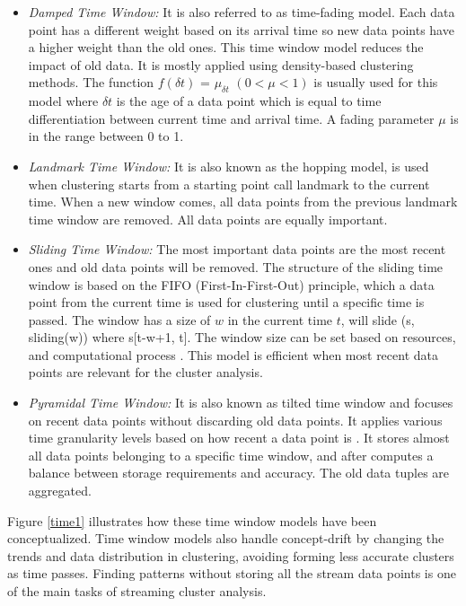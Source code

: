 \begin{itemize}

    \item\textit{Damped Time Window:} It is also referred to as time-fading model. Each data point has a different weight based on its arrival time so new data points have a higher weight than the old ones. This time window model reduces the impact of old data. It is mostly applied using density-based clustering methods. The function $f(\delta t)$ = $\mu_{\delta t}$ $(0 < \mu < 1)$ is usually used for this model where $\delta t$ is the age of a data point which is equal to time differentiation between current time and arrival time. A fading parameter $\mu$ is in the range between 0 to 1. 
    
    
    \item\textit{Landmark Time Window:} It is also known as the hopping model, is used when clustering starts from a starting point call landmark to the current time. When a new window comes, all data points from the previous landmark time window are removed. All data points are equally important.

    \item\textit{Sliding Time Window: } The most important data points are the most recent ones and old data points will be removed. The structure of the sliding time window is based on the FIFO (First-In-First-Out) principle, which a data point from the current time is used for clustering until a specific time is passed. The window has a size of $w$ in the current time $t$, will slide (s, sliding(w)) where s[t-w+1, t].
    The window size can be set based on resources, and computational process \cite{silva2013data}. This model is efficient when most recent data points are relevant for the cluster analysis.  
    
    \item\textit{Pyramidal Time Window: } It is also known as tilted time window and focuses on recent data points without discarding old data points. It applies various time granularity levels based on how recent a data point is \cite{aggarwal2003framework, nguyen2015survey}. It stores almost all data points belonging to a specific time window, and after computes a balance between storage requirements and accuracy. The old data tuples are aggregated. %
    
\end{itemize}    

Figure   \ref{time1} illustrates how these time window models have been conceptualized. Time window models also handle concept-drift by changing the trends and data distribution in clustering, avoiding forming less accurate clusters as time passes. Finding patterns without storing all the stream data points is one of the main tasks of streaming cluster analysis.

